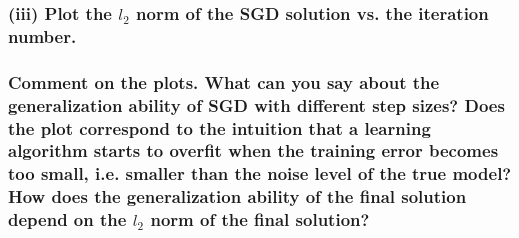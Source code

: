 \documentclass[11pt]{article}
\begin{document}
    \subsubsection{\texorpdfstring{(iii) Plot the \(l_2\) norm of the SGD
solution vs. the iteration
number.}{(iii) Plot the l\_2 norm of the SGD solution vs. the iteration number.}}\label{iii-plot-the-l_2-norm-of-the-sgd-solution-vs.-the-iteration-number.}

\subsubsection{\texorpdfstring{Comment on the plots. What can you say
about the generalization ability of SGD with different step sizes? Does
the plot correspond to the intuition that a learning algorithm starts to
overfit when the training error becomes too small, i.e. smaller than the
noise level of the true model? How does the generalization ability of
the final solution depend on the \(l_2\) norm of the final
solution?}{Comment on the plots. What can you say about the generalization ability of SGD with different step sizes? Does the plot correspond to the intuition that a learning algorithm starts to overfit when the training error becomes too small, i.e. smaller than the noise level of the true model? How does the generalization ability of the final solution depend on the l\_2 norm of the final solution?}}\label{comment-on-the-plots.-what-can-you-say-about-the-generalization-ability-of-sgd-with-different-step-sizes-does-the-plot-correspond-to-the-intuition-that-a-learning-algorithm-starts-to-overfit-when-the-training-error-becomes-too-small-i.e.-smaller-than-the-noise-level-of-the-true-model-how-does-the-generalization-ability-of-the-final-solution-depend-on-the-l_2-norm-of-the-final-solution}
\end{document}
